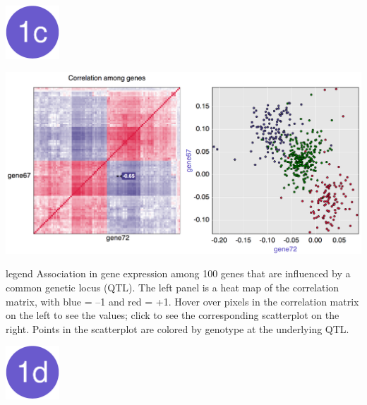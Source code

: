 \documentclass[final,plain]{beamer}
\newlength{\onecolwid}
\newlength{\twocolwid}
\newcommand{\colfourvsep}{\vspace{16mm}}
\begin{document}
\begin{frame}[t]
\begin{columns}[t]
\begin{column}{\twocolwid}
\begin{columns}[t]
\begin{column}{\onecolwid}
        \href{http://www.biostat.wisc.edu/~kbroman/posters/ENAR2014/1c}{\includegraphics[width=2cm]{Figs/dot1c.pdf}}

        \centerline{\href{http://www.biostat.wisc.edu/~kbroman/posters/ENAR2014/1c}{\includegraphics[width=\onecolwid]{Figs/1c.png}}}

      \vspace{10mm} %

        \begin{beamercolorbox}[sep=1em, wd=\onecolwid]{legend} \rmfamily
           Association in gene expression among 100 genes that are
           influenced by a common genetic locus (QTL).  The left panel
           is a heat map of the correlation matrix, with blue = --1
           and red = +1. Hover over pixels in the correlation matrix
           on the left to see the values; click to see the
           corresponding scatterplot on the right. Points in the
           scatterplot are colored by genotype at the underlying QTL.
        \end{beamercolorbox}


    \colfourvsep %

        \href{http://www.biostat.wisc.edu/~kbroman/posters/ENAR2014/1d}{\includegraphics[width=2cm]{Figs/dot1d.pdf}}

        \vspace{4mm}


\end{column}
\end{columns}
\end{column}
\end{columns}
\end{frame}
\end{document}
